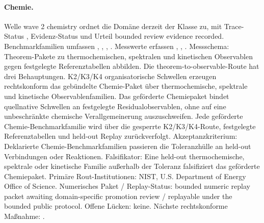 \paragraph{Chemie.}
Welle wave 2 chemistry ordnet die Domäne derzeit der Klasse  zu, mit Trace-Status , Evidenz-Status  und Urteil bounded review evidence recorded.
Benchmarkfamilien umfassen , \allowbreak {}, \allowbreak {}, \allowbreak {}.
Messwerte erfassen , \allowbreak {}, \allowbreak {}.
Messschema: Theorem-Pakete zu thermochemischen, spektralen und kinetischen Observablen gegen festgelegte Referenztabellen abbilden.
Die theorem-to-observable-Route hat drei Behauptungen. K2/K3/K4 organisatorische Schwellen erzeugen rechtskonform das gebündelte Chemie-Paket über thermochemische, spektrale und kinetische Observablenfamilien. Das geförderte Chemiepaket bindet quellnative Schwellen an festgelegte Residualobservablen, ohne auf eine unbeschränkte chemische Verallgemeinerung auszuschweifen. Jede geförderte Chemie-Benchmarkfamilie wird über die gesperrte K2/K3/K4-Route, festgelegte Referenztabellen und held-out Replay zurückverfolgt.
Akzeptanzkriterium: Deklarierte Chemie-Benchmarkfamilien passieren die Toleranzhülle an held-out Verbindungen oder Reaktionen.
Falsifikator: Eine held-out thermochemische, spektrale oder kinetische Familie außerhalb der Toleranz falsifiziert das geförderte Chemiepaket.
Primäre Rout-Institutionen: NIST, \allowbreak U.S. Department of Energy Office of Science.
Numerisches Paket / Replay-Status: bounded numeric replay packet awaiting domain-specific promotion review / replayable under the bounded public protocol.
Offene Lücken: keine.
Nächste rechtskonforme Maßnahme: .


